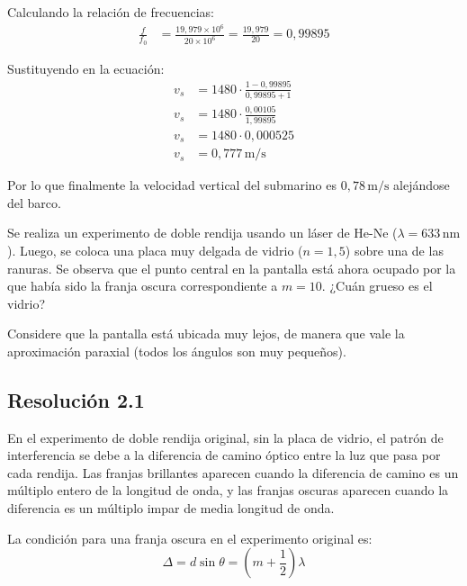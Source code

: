 \documentclass[
  11pt,
  letterpaper,
   addpoints,
   answers
  ]{exam}
\begin{document}
\begin{questions}
\begin{solution}
Calculando la relación de frecuencias:
\begin{align}
\frac{f}{f_0} &= \frac{19{,}979 \times 10^6}{20 \times 10^6} = \frac{19{,}979}{20} = 0{,}99895
\end{align}

Sustituyendo en la ecuación:
\begin{align}
v_s &= 1480 \cdot \frac{1 - 0{,}99895}{0{,}99895 + 1} \\
v_s &= 1480 \cdot \frac{0{,}00105}{1{,}99895} \\
v_s &= 1480 \cdot 0{,}000525 \\
v_s &= 0{,}777\,\mathrm{m/s}
\end{align}

Por lo que finalmente la velocidad vertical del submarino es $\boxed{0{,}78\,\mathrm{m/s}}$ alejándose del barco.

\end{solution}
\question Se realiza un experimento de doble rendija usando un láser de He-Ne ($\lambda = 633\,\mathrm{nm}$). Luego, se coloca una placa muy delgada de vidrio ($n = 1{,}5$) sobre una de las ranuras. Se observa que el punto central en la pantalla está ahora ocupado por la que había sido la franja oscura correspondiente a $m = 10$. ¿Cuán grueso es el vidrio?

Considere que la pantalla está ubicada muy lejos, de manera que vale la aproximación paraxial (todos los ángulos son muy pequeños).
\begin{solution}
\subsection*{Resolución 2.1}

En el experimento de doble rendija original, sin la placa de vidrio, el patrón de interferencia se debe a la diferencia de camino óptico entre la luz que pasa por cada rendija. Las franjas brillantes aparecen cuando la diferencia de camino es un múltiplo entero de la longitud de onda, y las franjas oscuras aparecen cuando la diferencia es un múltiplo impar de media longitud de onda.


La condición para una franja oscura en el experimento original es:
\begin{equation}
\Delta = d \sin \theta = \left(m + \frac{1}{2}\right) \lambda
\end{equation}


\end{solution}
\end{questions}
\end{document}
